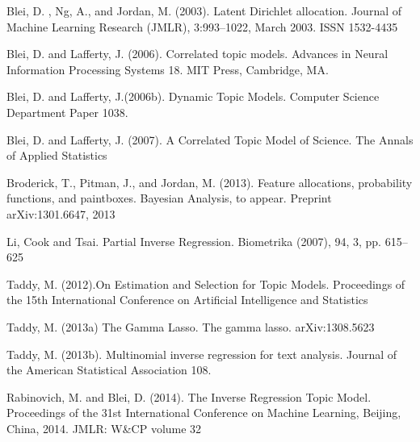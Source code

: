 \documentclass[12pt]{article}
\begin{document}
\begin{thebibliography}{99}

 Blei, D. , Ng, A., and Jordan, M. (2003). Latent Dirichlet allocation. Journal of Machine Learning Research (JMLR), 3:993–1022, March 2003. ISSN 1532-4435

 Blei, D. and Lafferty, J. (2006). Correlated topic models. Advances in Neural Information Processing Systems 18. MIT Press, Cambridge, MA.

 Blei, D. and Lafferty, J.(2006b). Dynamic Topic Models. Computer Science Department Paper 1038.

  Blei, D. and Lafferty, J. (2007). A Correlated Topic Model of Science. The Annals of Applied Statistics

 Broderick, T.,  Pitman, J.,  and Jordan, M. (2013). Feature allocations, probability functions, and paintboxes. Bayesian Analysis, to appear. Preprint arXiv:1301.6647, 2013

  Li, Cook  and Tsai. Partial Inverse Regression. Biometrika (2007), 94, 3, pp. 615–625

 Taddy, M. (2012).On Estimation and Selection for Topic Models.  Proceedings of the 15th International Conference on Artificial Intelligence and Statistics

 Taddy, M.  (2013a) The Gamma Lasso. The gamma lasso. arXiv:1308.5623

 Taddy, M. (2013b). Multinomial inverse regression for text analysis. Journal of the American Statistical Association 108.

 Rabinovich, M. and Blei, D. (2014). The Inverse Regression Topic Model. Proceedings of the 31st International Conference on Machine Learning, Beijing, China, 2014. JMLR: W\&CP volume 32








\end{thebibliography}
\end{document}
